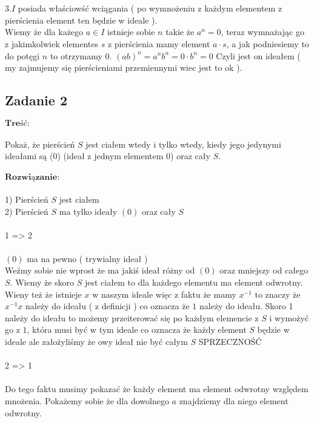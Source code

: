 \\ \\
3.$I$ posiada właściowść wciągania ( po wymnożeniu z każdym elementem z pierścienia element ten będzie w ideale ).
\\
Wiemy że dla każego $a \in I$ istnieje sobie $n$ takie że $a^{n} = 0$, teraz wymnażając go z jakimkolwiek elementes $s$ z pierścienia mamy element $a\cdot s$, a jak podniesiemy to do potęgi $n$ to otrzymamy $0$. $(ab)^n = a^{n}b^{n} = 0\cdot b^{n} = 0$ Czyli jest on ideałem ( my zajmujemy się pierścieniami przemiennymi wiec jest to ok ).



\subsection{Zadanie 2}
$\textbf{Treść:}$ \\ \\
Pokaż, że pierścień $S$ jest ciałem wtedy i tylko wtedy, kiedy jego jedynymi
ideałami są (0) (ideał z jednym elementem 0) oraz cały $S$.
\\
\\
$\textbf{Rozwiązanie:}$ \\
\\
1) Pierścień $S$ jest ciałem \\
2) Pierścień $S$ ma tylko ideały $(0)$ oraz cały $S$ \\
\\
1 => 2 \\ \\
$(0)$ ma na pewno ( trywialny ideał ) \\
Weźmy sobie nie wprost że ma jakiś ideał różny od $(0)$ oraz mniejszy od całego $S$. Wiemy że skoro $S$ jest ciałem to dla każdego elementu ma element odwrotny. Wieny też że istnieje $x$ w naszym ideale więc z faktu że mamy $x^{-1}$ to znaczy że $x^{-1}x$ należy do ideału ( z definicji ) co oznacza że $1$ należy do ideału. Skoro 1 należy do ideału to możemy przeiterować się po każdym elemencie z $S$ i wymożyć go z $1$, która musi być w tym ideale co oznacza że każdy element $S$ będzie w ideale ale założyliśmy że owy ideał nie być całym $S$ SPRZECZNOŚĆ \\
\\
2 => 1 \\ \\
Do tego faktu musimy pokazać że każdy element ma element odwrotny względem mnożenia. Pokażemy sobie że dla dowolnego $a$ znajdziemy dla niego element odwrotny. \\ \\
